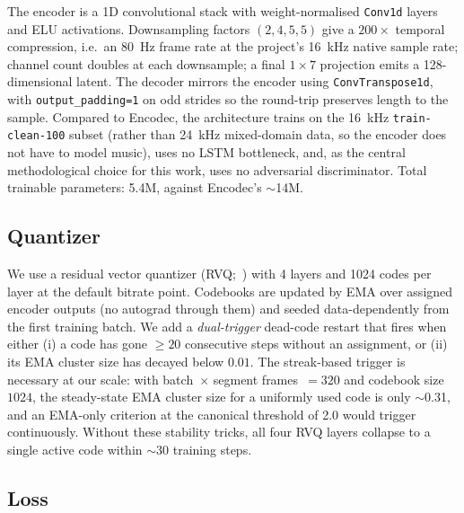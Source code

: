 \documentclass[11pt]{article}
\begin{document}
The encoder is a 1D convolutional stack with weight-normalised
\citep{salimans2016weight} \texttt{Conv1d} layers and ELU activations.
Downsampling factors $(2,4,5,5)$ give a $200\times$ temporal
compression, i.e.\ an 80~Hz frame rate at the project's 16~kHz native
sample rate; channel count doubles at each downsample; a final
$1\times 7$ projection emits a 128-dimensional latent. The decoder
mirrors the encoder using \texttt{ConvTranspose1d}, with
\texttt{output\_padding=1} on odd strides so the round-trip preserves
length to the sample. Compared to Encodec, the architecture trains
on the 16~kHz \texttt{train-clean-100} subset (rather than 24~kHz
mixed-domain data, so the encoder does not have to model music), uses
no LSTM bottleneck, and, as the central methodological choice for
this work, uses no adversarial discriminator. Total trainable
parameters: 5.4M, against Encodec's $\sim$14M.

\subsection{Quantizer}
\label{sec:rvq}

We use a residual vector quantizer (RVQ;~\citealp{zeghidour2021soundstream})
with 4 layers and 1024 codes per layer at the default bitrate point.
Codebooks are updated by EMA over assigned encoder outputs (no
autograd through them) and seeded data-dependently from the first
training batch.
We add a \emph{dual-trigger} dead-code restart that fires when either
(i) a code has gone $\geq 20$ consecutive steps without an assignment,
or (ii) its EMA cluster size has decayed below $0.01$.
The streak-based trigger is necessary at our scale: with batch~$\times$
segment frames~$=320$ and codebook size~$1024$, the steady-state EMA
cluster size for a uniformly used code is only $\sim$0.31, and an
EMA-only criterion at the canonical \citep{defossez2022high}
threshold of 2.0 would trigger continuously.
Without these stability tricks, all four RVQ layers collapse to a
single active code within $\sim$30 training steps.

\subsection{Loss}
\label{sec:loss}
\end{document}
